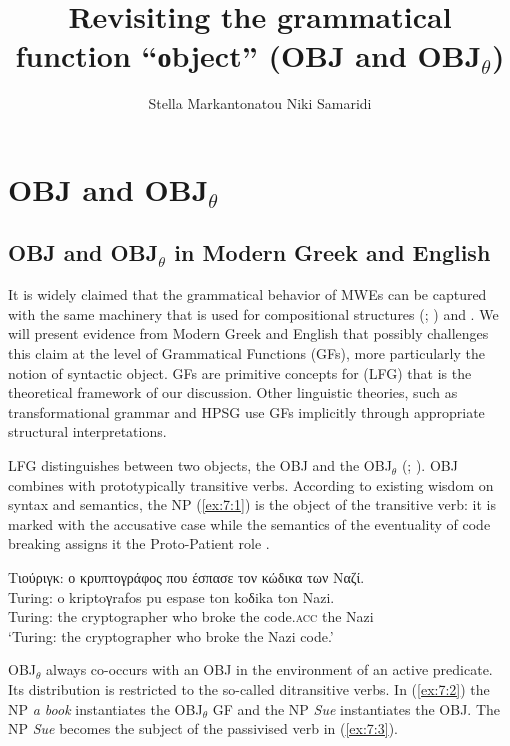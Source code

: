 \documentclass[output=paper]{langsci/langscibook}
\title{Revisiting the grammatical function ``οbject'' (OBJ and OBJ$_\theta$)}
\author{Stella Markantonatou\affiliation{Institute for Language and Speech Processing, Athena RIC, Greece}%
\lastand Niki Samaridi\affiliation{Faculty of Philology, National and Kapodistrian University of Athens}}
\begin{document}
\section{OBJ and OBJ$_\theta$}\label{sec:mark:1}

\subsection{OBJ and OBJ$_\theta$ in Modern Greek and English}

It is widely claimed that the grammatical behavior of MWEs can be captured with
the same machinery that is used for compositional structures (\citealt{Gross1988a,Gross1988b}; \citealt{kaysagidioms}) and
. We will present evidence from Modern Greek  and English that possibly challenges this claim at the level of Grammatical Functions (GFs), more particularly the notion of syntactic object.  GFs are primitive concepts for  (LFG) that is the theoretical framework of our discussion. Other linguistic theories, such as transformational grammar \citep{baker2001} and HPSG \citep{Pollard:Sag:94} use GFs implicitly through appropriate structural interpretations.

LFG distinguishes between two objects, the OBJ and the OBJ$_\theta$ (\citealt{bresnanmoshi1990}; \citealt{dalrymple2001}). OBJ combines with prototypically transitive verbs. According to existing wisdom on syntax and semantics, the NP  (\ref{ex:7:1}) is the object of the transitive verb: it is marked with the accusative case while the semantics of the eventuality of code breaking assigns it the Proto-Patient role \citep{dowty90}.

\begin{exe}
\ex \label{ex:7:1}
\glll Τιούριγκ: ο κρυπτογράφος που έσπασε τον κώδικα των Ναζί.\\ 
Turing: o kriptoγrafos pu espase ton koδika ton Nazi.\\
     Turing: the cryptographer who broke the code.\textsc{acc} the Nazi\\
\glt `Turing: the cryptographer who broke the Nazi code.'
\end{exe}

OBJ$_\theta$ \citep{bresnanmoshi1990} always co-occurs with an OBJ in the environment of an active predicate. Its distribution is restricted to the so-called  ditransitive verbs. In (\ref{ex:7:2}) the NP \textit{a book} instantiates the OBJ$_\theta$ GF and the NP \textit{Sue} instantiates the OBJ. The NP \textit{Sue} becomes the subject of the passivised verb in (\ref{ex:7:3}).
\end{document}
